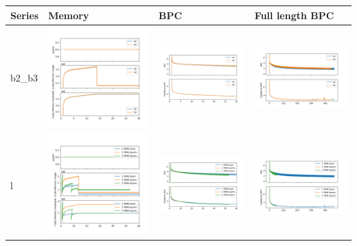 \pagebreak
\begin{longtable}[]{@{}llll@{}}
\hline
Series & Memory & BPC & Full length
BPC\tabularnewline
\hline
\endhead
b2\_b3 & 
\includegraphics[width=.31\textwidth]{parts/appendix/reports-gmsnn/docs_esteban-latex/test_reports/2018-06-27/b2_b3_memory.png} &
\includegraphics[width=.31\textwidth]{parts/appendix/reports-gmsnn/docs_esteban-latex/test_reports/2018-06-27/b2_b3_frac.png} &
\includegraphics[width=.31\textwidth]{parts/appendix/reports-gmsnn/docs_esteban-latex/test_reports/2018-06-27/b2_b3_frac_full.png}\tabularnewline

l & 
\includegraphics[width=.31\textwidth]{parts/appendix/reports-gmsnn/docs_esteban-latex/test_reports/2018-06-27/l_memory.png} &
 \includegraphics[width=.31\textwidth]{parts/appendix/reports-gmsnn/docs_esteban-latex/test_reports/2018-06-27/l_frac.png} &
\includegraphics[width=.31\textwidth]{parts/appendix/reports-gmsnn/docs_esteban-latex/test_reports/2018-06-27/l_frac_full.png}\tabularnewline


\end{longtable}
